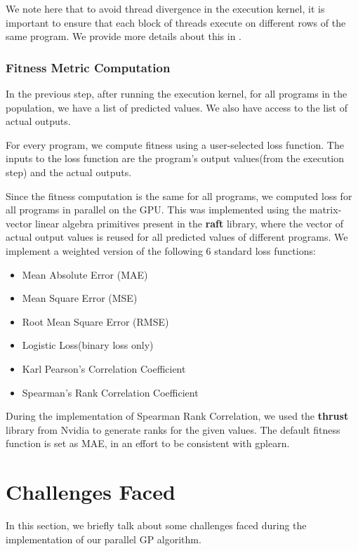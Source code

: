 We note here that to avoid thread divergence in the execution kernel, it is important to ensure that each block of threads execute on different rows of the same program. We provide more details about this in .

\subsubsection{Fitness Metric Computation}
\label{subsec:fitness}
In the previous step, after running the execution kernel, for all programs in the population, we have a list of predicted values. We also have access to the list of actual outputs. 

For every program, we compute fitness using a user-selected loss function. The inputs to the loss function are the program's output values(from the execution step) and the actual outputs.

Since the fitness computation is the same for all programs, we computed loss for all programs in parallel on the GPU. This was implemented using the matrix-vector linear algebra primitives present in the \textbf{raft} library\citep{raschka2020machine}, where the vector of actual output values is reused for all predicted values of different programs. We implement a weighted version of the following $6$ standard loss functions:
\begin{itemize}
    \item Mean Absolute Error (MAE)
    \item Mean Square Error (MSE)
    \item Root Mean Square Error (RMSE)
    \item Logistic Loss(binary loss only)
    \item Karl Pearson's Correlation Coefficient
    \item Spearman's Rank Correlation Coefficient
\end{itemize}
During the implementation of Spearman Rank Correlation, we used the \textbf{thrust} library from Nvidia to generate ranks for the given values. The default fitness function is set as MAE, in an effort to be consistent with gplearn\citep{gplearn}.

\section{Challenges Faced}
\label{sec:challenges}
In this section, we briefly talk about some challenges faced during the implementation of our parallel GP algorithm.

